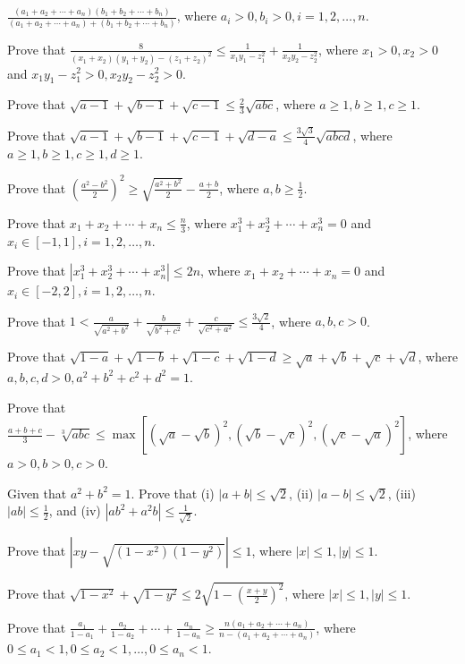   $\frac{(a_1 + a_2 + \cdots + a_n)(b_1 + b_2 + \cdots + b_n)}{(a_1 + a_2 + \cdots + a_n) + (b_1 + b_2 + \cdots + b_n)}$, where $a_i
  > 0, b_i > 0, i = 1, 2, \ldots, n$.
\item Prove that $\frac{8}{(x_1 + x_2)(y_1 + y_2) - (z_1 + z_2)^2} \leq \frac{1}{x_1y_1 - z_1^2} + \frac{1}{x_2y_2 - z_2^2}$, where
  $x_1 > 0, x_2 > 0$ and $x_1y_1 - z_1^2 > 0, x_2y_2 - z_2^2 > 0$.
\item Prove that $\sqrt{a - 1} + \sqrt{b - 1} + \sqrt{c - 1} \leq \frac{2}{3}\sqrt{abc}$, where $a\geq 1, b\geq 1, c\geq 1$.
\item Prove that $\sqrt{a - 1} + \sqrt{b - 1} + \sqrt{c - 1} + \sqrt{d - a}\leq \frac{3\sqrt{3}}{4}\sqrt{abcd}$, where $a\geq 1,
  b\geq 1, c\geq 1, d\geq 1$.
\item Prove that $\left(\frac{a^2 - b^2}{2}\right)^2 \geq \sqrt{\frac{a^2 + b^2}{2}} - \frac{a + b}{2}$, where $a, b\geq
  \frac{1}{2}$.
\item Prove that $x_1 + x_2 + \cdots + x_n \leq \frac{n}{3}$, where $x_1^3 + x_2^3 + \cdots + x_n^3 = 0$ and $x_i\in[-1, 1], i = 1,
  2, \ldots, n$.
\item Prove that $|x_1^3 + x_2^3 + \cdots + x_n^3|\leq 2n$, where $x_1 + x_2 + \cdots + x_n = 0$ and $x_i\in [-2, 2], i = 1, 2,
  \ldots, n$.
\item Prove that $1 < \frac{a}{\sqrt{a^2 + b^2}} + \frac{b}{\sqrt{b^2 + c^2}} + \frac{c}{\sqrt{c^2 + a^2}}\leq
  \frac{3\sqrt{2}}{4}$, where $a, b, c > 0$.
\item Prove that $\sqrt{1 - a} + \sqrt{1 - b} + \sqrt{1 - c} + \sqrt{1 - d}\geq \sqrt{a} + \sqrt{b} + \sqrt{c} + \sqrt{d}$, where
  $a, b, c, d > 0, a^2 + b^2 + c^2 + d^2 = 1$.
\item Prove that $\frac{a + b + c}{3} - \sqrt[3]{abc}\leq \max\left[\left(\sqrt{a} - \sqrt{b}\right)^2, \left(\sqrt{b} -
  \sqrt{c}\right)^2, \left(\sqrt{c} - \sqrt{a}\right)^2\right]$, where $a > 0, b > 0, c > 0$.
\item Given that $a^2 + b^2 = 1$. Prove that (i) $|a + b|\leq \sqrt{2}$, (ii) $|a - b|\leq \sqrt{2}$, (iii) $|ab|\leq \frac{1}{2}$,
  and (iv) $|ab^2 + a^2b|\leq \frac{1}{\sqrt{2}}$.
\item Prove that $|xy - \sqrt{(1 - x^2)(1 - y^2)}|\leq 1$, where $|x|\leq 1, |y|\leq 1$.
\item Prove that $\sqrt{1 - x^2} + \sqrt{1 - y^2}\leq 2\sqrt{1 - \left(\frac{x + y}{2}\right)^2}$, where $|x|\leq 1, |y|\leq 1$.
\item Prove that $\frac{a_1}{1 - a_1} + \frac{a_2}{1 - a_2} + \cdots + \frac{a_n}{1 - a_n}\geq \frac{n(a_1 + a_2 + \cdots + a_n)}{n
  - (a_1 + a_2 + \cdots + a_n)}$, where $0\leq a_1<1, 0\leq a_2<1, \ldots, 0\leq a_n<1$.
